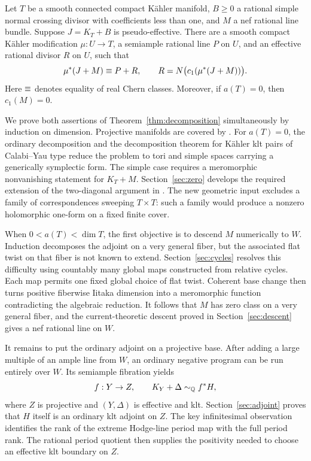 \begin{theorem}\label{thm:decomposition}
Let \(T\) be a smooth connected compact K\"ahler manifold, \(B\geq0\)
a rational simple normal crossing divisor with coefficients less than
one, and \(M\) a nef rational line bundle. Suppose
\(J=K_T+B\) is pseudo-effective. There are a smooth compact K\"ahler
modification \(\mu:U\to T\), a semiample rational line \(P\) on \(U\),
and an effective rational divisor \(R\) on \(U\), such that
\[
 \mu^*(J+M)\equiv P+R,\qquad
 R=N\bigl(c_1(\mu^*(J+M))\bigr).
\]
Here \(\equiv\) denotes equality of real Chern classes.
Moreover, if \(a(T)=0\), then \(c_1(M)=0\).
\end{theorem}

We prove both assertions of Theorem~\ref{thm:decomposition}
simultaneously by induction on dimension. Projective manifolds are
covered by \cite{P}. For \(a(T)=0\), the ordinary decomposition and
the decomposition theorem for K\"ahler klt pairs of Calabi--Yau type
\cite[Corollary~1.4]{BBYv2} reduce the problem to tori and simple
spaces carrying a generically symplectic form. The simple case requires
a meromorphic nonvanishing statement for \(K_T+M\).
Section~\ref{sec:zero} develops the required extension of the
two-diagonal argument in \cite[Section~6]{K}. The new geometric input
excludes a family of correspondences sweeping \(T\times T\): such a
family would produce a nonzero holomorphic one-form on a fixed finite
cover.

When \(0<a(T)<\dim T\), the first objective is to descend \(M\)
numerically to \(W\). Induction decomposes the adjoint on a very general
fiber, but the associated flat twist on that fiber is not known to
extend. Section~\ref{sec:cycles} resolves this difficulty using
countably many global maps constructed from relative cycles.
Each map permits one fixed global choice of flat twist. Coherent
base change then turns positive fiberwise Iitaka dimension into a
meromorphic function contradicting the algebraic reduction.
It follows that \(M\) has zero class on a very general fiber, and
the current-theoretic descent proved in Section~\ref{sec:descent}
gives a nef rational line on \(W\).

It remains to put the ordinary adjoint on a projective base.
After adding a large multiple of an ample line from \(W\), an ordinary
negative program can be run entirely over \(W\).
Its semiample fibration yields
\[
 f:Y\to Z,\qquad K_Y+\Delta\sim_{\mathbb Q} f^*H,
\]
where \(Z\) is projective and \((Y,\Delta)\) is effective and klt.
Section~\ref{sec:adjoint} proves that \(H\) itself is an ordinary
klt adjoint on \(Z\). The key infinitesimal observation identifies
the rank of the extreme Hodge-line period map with the full period
rank. The rational period quotient then supplies the positivity
needed to choose an effective klt boundary on \(Z\).

